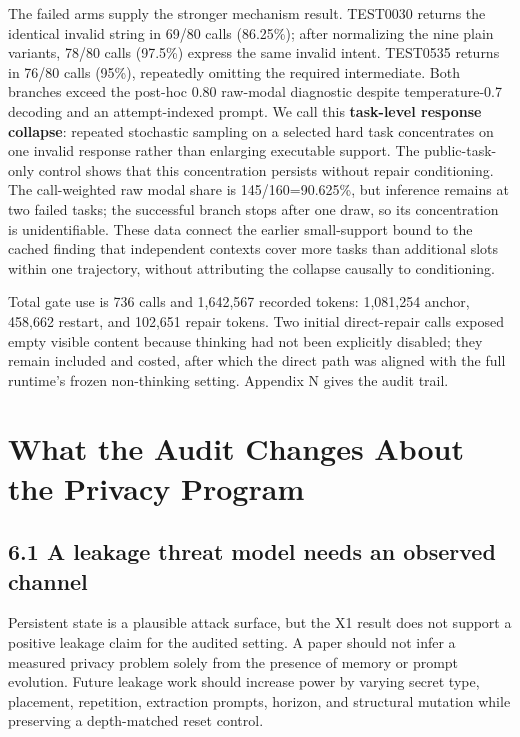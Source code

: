 \documentclass{article}
\begin{document}
The failed arms supply the stronger mechanism result. TEST0030 returns the identical invalid string \texttt{\detokenize{["IMPOSSIBLE"]}} in 69/80 calls (86.25\%); after normalizing the nine plain \texttt{} variants, 78/80 calls (97.5\%) express the same invalid intent. TEST0535 returns \texttt{} in 76/80 calls (95\%), repeatedly omitting the required \texttt{} intermediate. Both branches exceed the post-hoc 0.80 raw-modal diagnostic despite temperature-0.7 decoding and an attempt-indexed prompt. We call this \textbf{task-level response collapse}: repeated stochastic sampling on a selected hard task concentrates on one invalid response rather than enlarging executable support. The public-task-only control shows that this concentration persists without repair conditioning. The call-weighted raw modal share is 145/160=90.625\%, but inference remains at two failed tasks; the successful branch stops after one draw, so its concentration is unidentifiable. These data connect the earlier small-support bound to the cached finding that independent contexts cover more tasks than additional slots within one trajectory, without attributing the collapse causally to conditioning.

Total gate use is 736 calls and 1,642,567 recorded tokens: 1,081,254 anchor, 458,662 restart, and 102,651 repair tokens. Two initial direct-repair calls exposed empty visible content because thinking had not been explicitly disabled; they remain included and costed, after which the direct path was aligned with the full runtime's frozen non-thinking setting. Appendix N gives the audit trail.

\section{What the Audit Changes About the Privacy Program}

\subsection{6.1 A leakage threat model needs an observed channel}

Persistent state is a plausible attack surface, but the X1 result does not support a positive leakage claim for the audited setting. A paper should not infer a measured privacy problem solely from the presence of memory or prompt evolution. Future leakage work should increase power by varying secret type, placement, repetition, extraction prompts, horizon, and structural mutation while preserving a depth-matched reset control.
\end{document}
